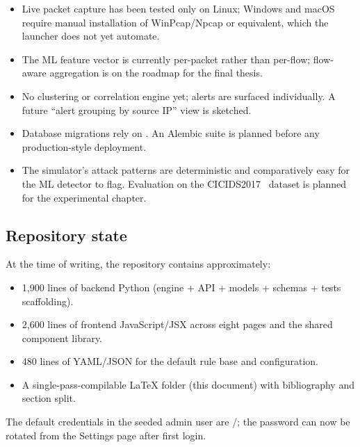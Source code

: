 \begin{itemize}
    \item Live packet capture has been tested only on Linux; Windows
        and macOS require manual installation of WinPcap/Npcap or
        equivalent, which the launcher does not yet automate.
    \item The ML feature vector is currently per-packet rather than
        per-flow; flow-aware aggregation is on the roadmap for the
        final thesis.
    \item No clustering or correlation engine yet; alerts are surfaced
        individually. A future ``alert grouping by source IP'' view is
        sketched.
    \item Database migrations rely on . An Alembic
        suite is planned before any production-style deployment.
    \item The simulator's attack patterns are deterministic and
        comparatively easy for the ML detector to flag. Evaluation on
        the CICIDS2017~\cite{sharafaldin2018cicids} dataset is planned
        for the experimental chapter.
\end{itemize}

\subsection{Repository state}

At the time of writing, the repository contains approximately:
\begin{itemize}
    \item 1{,}900 lines of backend Python (engine + API + models +
        schemas + tests scaffolding).
    \item 2{,}600 lines of frontend JavaScript/JSX across eight pages
        and the shared component library.
    \item 480 lines of YAML/JSON for the default rule base and
        configuration.
    \item A single-pass-compilable LaTeX folder (this document) with
        bibliography and section split.
\end{itemize}
The default credentials in the seeded admin user are
/; the password can now be rotated from the
Settings page after first login.

